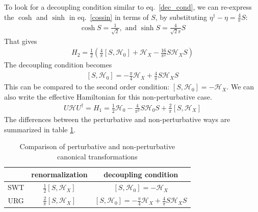 To look for a decoupling condition similar to eq.~\ref{dec_cond}, we can re-express the \(\cosh\) and \(\sinh\) in eq.~\ref{cossin} in terms of \(S\), by substituting \(\eta^\dagger - \eta = \frac{4}{\pi}S\):
\begin{equation}\begin{aligned}
\cosh S = \frac{1}{\sqrt 2},\text{ and } \sinh S = \frac{4}{\sqrt 2 \pi}S
\end{aligned}\end{equation}
That gives
\begin{equation}\begin{aligned}
	H_2 = \frac{1}{2}\left(\frac{4}{\pi}\left[S,\mathcal{H}_0\right] + \mathcal{H}_X - \frac{16}{\pi^2}S \mathcal{H}_X S\right)
\end{aligned}\end{equation}
The decoupling condition becomes
\begin{equation}\begin{aligned}
	\left[S,\mathcal{H}_0\right] = -\frac{\pi}{4}\mathcal{H}_X + \frac{4}{\pi}S \mathcal{H}_X S
\end{aligned}\end{equation}
This can be compared to the second order condition: \(\left[S,\mathcal{H}_0\right] = -\mathcal{H}_X\). We  can also write the effective Hamiltonian for this non-perturbative case.
\begin{equation}\begin{aligned}
	U\mathcal{H} U^\dagger = H_1 = \frac{1}{2} \mathcal{H}_0 - \frac{4}{\pi^2}S\mathcal{H}_0 S  + \frac{2}{\pi}\left[S,\mathcal{H}_X\right]
\end{aligned}\end{equation}
The differences between the perturbative and non-perturbative ways are summarized in table \ref{comparison}.
\begin{table}
\centering
\begin{tabular}{|c|c|c|}
    \hline
        &renormalization&decoupling condition\\
    \hline
	SWT&\(\frac{1}{2} \left[S,\mathcal{H}_X\right]\)&\(\left[S,\mathcal{H}_0\right] = -\mathcal{H}_X\)\\
	URG&\(\frac{2}{\pi}\left[S,\mathcal{H}_X\right]\)&\(\left[S,\mathcal{H}_0\right] = -\frac{\pi}{4}\mathcal{H}_X + \frac{4}{\pi}S \mathcal{H}_X S\)\\
    \hline
\end{tabular}
    \caption{Comparison of perturbative and non-perturbative canonical transformations}
    \label{comparison}
\end{table}
